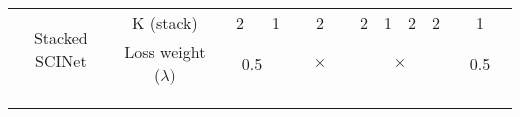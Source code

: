 \documentclass{article}
\begin{document}
\begin{table*}[h]
{\begin{tabular}{ccclllclllclllclll}
\multicolumn{1}{c|}{\multirow{2}{*}{Stacked SCINet}} & \multicolumn{1}{c|}{K (stack)}                            & \multicolumn{3}{c|}{2}  & \multicolumn{1}{c|}{1}                                                                            & \multicolumn{4}{c|}{2}                                                                              & \multicolumn{1}{c|}{2}& \multicolumn{1}{c|}{1}& \multicolumn{1}{c|}{2}& \multicolumn{1}{c|}{2}                                                                              & \multicolumn{4}{c}{1}                                                                             \\ \cline{2-18} 
\multicolumn{1}{c|}{}                                & \multicolumn{1}{c|}{Loss weight ($\lambda)$} & \multicolumn{4}{c|}{0.5}                                                          & \multicolumn{4}{c|}{$\times$}                                                                            & \multicolumn{4}{c|}{$\times$}                                                          & \multicolumn{4}{c}{0.5}                                                                           \\ \hline
\multicolumn{1}{l}{}                                 & \multicolumn{1}{l}{}                                      & \multicolumn{1}{l}{}   &                        &                         &                         & \multicolumn{1}{l}{}   &                        &                         &                         & \multicolumn{1}{l}{}   &                        &                         &                         & \multicolumn{1}{l}{}   &                        &                         &                        \\
\multicolumn{1}{l}{}                                 & \multicolumn{1}{l}{}                                      & \multicolumn{1}{l}{}   &                        &                         &                         & \multicolumn{1}{l}{}   &                        &                         &                         & \multicolumn{1}{l}{}   &                        &                         &                         & \multicolumn{1}{l}{}   &                        &                         &                        \\
\multicolumn{1}{l}{}                                 & \multicolumn{1}{l}{}                                      & \multicolumn{1}{l}{}   &                        &                         &                         & \multicolumn{1}{l}{}   &                        &                         &                         & \multicolumn{1}{l}{}   &                        &                         &                         & \multicolumn{1}{l}{}   &                        &                         &                       
\end{tabular}}
\label{tab:hsolar}
\vspace{-24pt}
\end{table*}
\end{document}
